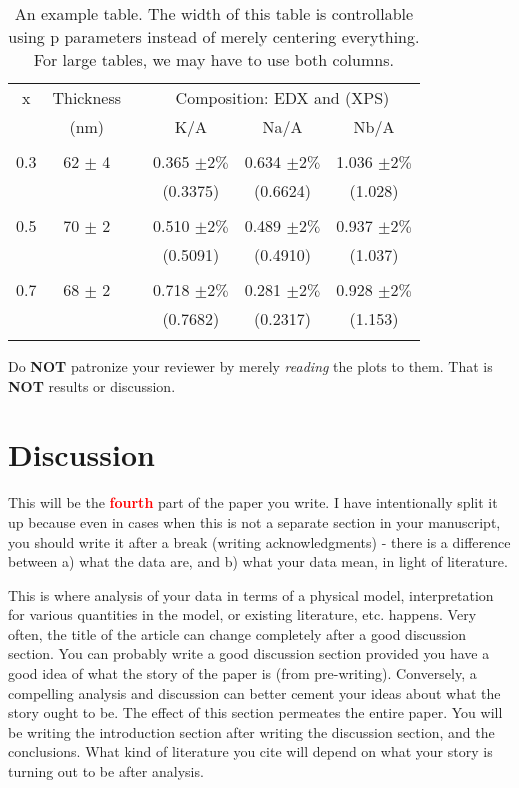 \documentclass[12pt,twocolumn]{article}
\begin{document}
\begin{table}
  \caption{An example table. The width of this table is controllable using p parameters instead of merely centering everything. For large tables, we may have to use both columns.}
  \label{tbl:ratio}
  \begin{center}
    \begin{tabular}{cccccc}
      x  & Thickness & & \multicolumn{3}{c}{Composition: EDX and (XPS)} \\
         & (nm) & & K/A & Na/A & Nb/A \\
      \hline \\
      0.3 & 62 $\pm$ 4 & & 0.365 $\pm 2\%$ & 0.634 $\pm 2\%$ & 1.036 $\pm 2\%$ \\
         & & & (0.3375) & (0.6624) & (1.028) \\
      \hline \\
      0.5 & 70 $\pm$ 2 & & 0.510 $\pm 2\%$ & 0.489 $\pm 2\%$ & 0.937 $\pm 2\%$ \\
         & & & (0.5091) & (0.4910) & (1.037) \\
      \hline \\
      0.7 & 68 $\pm$ 2 & & 0.718 $\pm 2\%$ & 0.281 $\pm 2\%$ & 0.928 $\pm 2\%$ \\
         & & & (0.7682) & (0.2317) & (1.153) \\
      \hline \\
    \end{tabular}
  \end{center}
\end{table}

Do \textbf{NOT} patronize your reviewer by merely \textit{reading} the plots to them. That is \textbf{NOT} results or discussion.

\section{Discussion}
\label{sec:discussion}

This will be the \textbf{\Huge \textcolor{red}{fourth}} part of the paper you write. I have intentionally split it up because even in cases when this is not a separate section in your manuscript, you should write it after a break (writing acknowledgments) - there is a difference between a) what the data are, and b) what your data mean, in light of literature.

This is where analysis of your data in terms of a physical model, interpretation for various quantities in the model, or existing literature, etc. happens. Very often, the title of the article can change completely after a good discussion section. You can probably write a good discussion section provided you have a good idea of what the story of the paper is (from pre-writing). Conversely, a compelling analysis and discussion can better cement your ideas about what the story ought to be. The effect of this section permeates the entire paper. You will be writing the introduction section after writing the discussion section, and the conclusions. What kind of literature you cite will depend on what your story is turning out to be after analysis.
\end{document}
